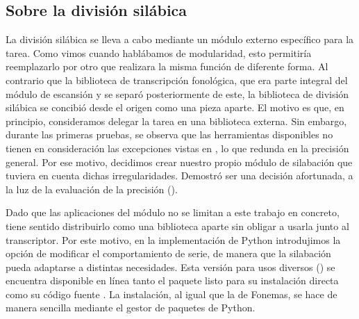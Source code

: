 \subsection{Sobre la división silábica}
La división silábica se lleva a cabo mediante un módulo externo específico para la tarea. Como vimos cuando hablábamos de modularidad, esto permitiría reemplazarlo por otro que realizara la misma función de diferente forma. Al contrario que la biblioteca de transcripción fonológica, que era parte integral del módulo de escansión y se separó posteriormente de este, la biblioteca de división silábica se concibió desde el origen como una pieza aparte. El motivo es que, en principio, consideramos delegar la tarea en una biblioteca externa. Sin embargo, durante las primeras pruebas, se observa que las herramientas disponibles no tienen en consideración las excepciones vistas en , lo que redunda en la precisión general. Por ese motivo, decidimos crear nuestro propio módulo de silabación que tuviera en cuenta dichas irregularidades. Demostró ser una decisión afortunada, a la luz de la evaluación de la precisión ().

Dado que las aplicaciones del módulo no se limitan a este trabajo en concreto, tiene sentido distribuirlo como una biblioteca aparte sin obligar a usarla junto al transcriptor. Por este motivo, en la implementación de Python introdujimos la opción de modificar el comportamiento de serie, de manera que la silabación pueda adaptarse a distintas necesidades. Esta versión para usos diversos () se encuentra disponible en línea tanto el paquete listo para su instalación directa como su código fuente \parencite{sanz2021sb}. La instalación, al igual que la de Fonemas, se hace de manera sencilla mediante el gestor de paquetes de Python.

